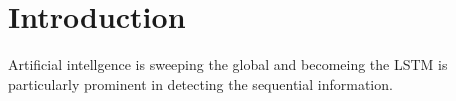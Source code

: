 \section{Introduction}
Artificial intellgence is sweeping the global and becomeing the 
LSTM is particularly prominent in detecting the sequential information. 